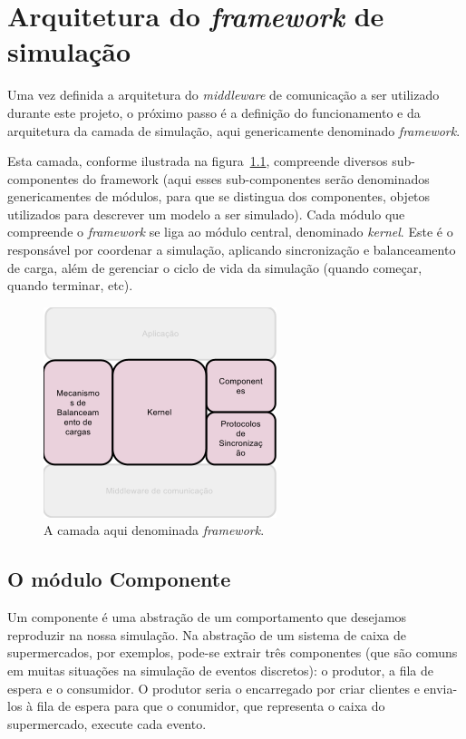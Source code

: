 \chapter{Arquitetura do \textit{framework} de simulação}

Uma vez definida a arquitetura do \textit{middleware} de comunicação a ser utilizado durante este projeto, o próximo passo é a definição do funcionamento e da arquitetura da camada de simulação, aqui genericamente denominado \textit{framework}.

Esta camada, conforme ilustrada na figura~\ref{fig:camada_central}, compreende diversos sub-componentes do framework (aqui esses sub-componentes serão denominados genericamentes de módulos, para que se distingua dos componentes, objetos utilizados para descrever um modelo a ser simulado). Cada módulo que compreende o \textit{framework} se liga ao módulo central, denominado \textit{kernel}. Este é o responsável por coordenar a simulação, aplicando sincronização e balanceamento de carga, além de gerenciar o ciclo de vida da simulação (quando começar, quando terminar, etc).

\begin{figure}
  \centerline{\includegraphics{camada_framework.png}}
  \caption{A camada aqui denominada \textit{framework}.}
\label{fig:camada_central}
\end{figure}

\section{O módulo Componente}

Um componente é uma abstração de um comportamento que desejamos reproduzir na nossa simulação. Na abstração de um sistema de caixa de supermercados, por exemplos, pode-se extrair três componentes (que são comuns em muitas situações na simulação de eventos discretos): o produtor, a fila de espera e o consumidor. O produtor seria o encarregado por criar clientes e envia-los à fila de espera para que o conumidor, que representa o caixa do supermercado, execute cada evento.

